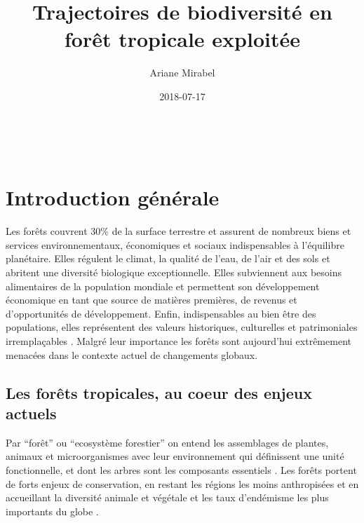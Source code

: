 \documentclass[
  11pt,
  french,
  A4paper,
  extrafontsizes,onecolumn,openright
  ]{memoir}
\title{Trajectoires de biodiversité en forêt tropicale exploitée}
\author{Ariane Mirabel}
\date{2018-07-17}
\begin{document}
\frontmatter



\makeflyleaf
\newpage
~
\newpage









\LargeMargins
{
\hypersetup{linkcolor=}
\setcounter{tocdepth}{3}
\tableofcontents
}



\LargeMargins
\mainmatter

\chapter{Introduction générale}\label{introduction-generale}

Les forêts couvrent 30\% de la surface terrestre et assurent de nombreux
biens et services environnementaux, économiques et sociaux
indispensables à l'équilibre planétaire. Elles régulent le climat, la
qualité de l'eau, de l'air et des sols et abritent une diversité
biologique exceptionnelle. Elles subviennent aux besoins alimentaires de
la population mondiale et permettent son développement économique en
tant que source de matières premières, de revenus et d'opportunités de
développement. Enfin, indispensables au bien être des populations, elles
représentent des valeurs historiques, culturelles et patrimoniales
irremplaçables \autocites{FRA2015}{Tilman2014}. Malgré leur importance
les forêts sont aujourd'hui extrêmement menacées dans le contexte actuel
de changements globaux.

\section{Les forêts tropicales, au coeur des enjeux
actuels}\label{les-forets-tropicales-au-coeur-des-enjeux-actuels}

Par ``forêt'' ou ``ecosystème forestier'' on entend les assemblages de
plantes, animaux et microorganismes avec leur environnement qui
définissent une unité fonctionnelle, et dont les arbres sont les
composants essentiels \autocite{FRA2000}. Les forêts portent de forts
enjeux de conservation, en restant les régions les moins anthropisées et
en accueillant la diversité animale et végétale et les taux d'endémisme
les plus importants du globe \autocites{Myers2000}{Mittermeier2003}.
\end{document}
